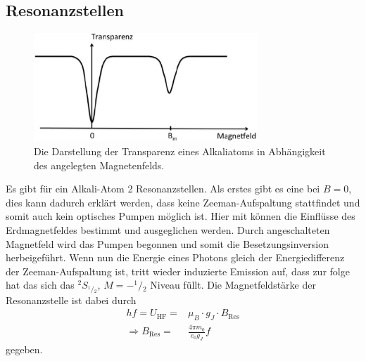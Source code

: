 \subsection{Resonanzstellen}
\begin{figure}[h!]
	\centering
	\includegraphics[width = 0.75\textwidth]{../Grafiken/Resonanz.pdf}
	\caption{Die Darstellung der Transparenz eines Alkaliatoms in Abhängigkeit des angelegten Magnetenfelds.\cite{V21}}\label{fit:Resonanz}
\end{figure}
Es gibt für ein Alkali-Atom 2 Resonanzstellen.
Als erstes gibt es eine bei $B=0$, dies kann dadurch erklärt werden, dass keine Zeeman-Aufspaltung stattfindet und somit auch kein optisches Pumpen möglich ist.
Hier mit können die Einflüsse des Erdmagnetfeldes bestimmt und ausgeglichen werden.
Durch angeschalteten Magnetfeld wird das Pumpen begonnen und somit die Besetzungsinversion herbeigeführt.
Wenn nun die Energie eines Photons gleich der Energiedifferenz der Zeeman-Aufspaltung ist, tritt wieder induzierte Emission auf, dass zur folge hat das sich das ${}^2S_{{}^1\!/\!_2}$, $M=-^1\!/\!_2$ Niveau füllt.
Die Magnetfeldstärke der Resonanzstelle ist dabei durch
\begin{align}
	hf = U_\text{HF} =& \mu_B\cdot g_J\cdot B_\text{Res}\\
	\Rightarrow B_\text{Res}=&\frac{4\pi m_0}{e_0g_J}f
\end{align}
gegeben.
\newpage
